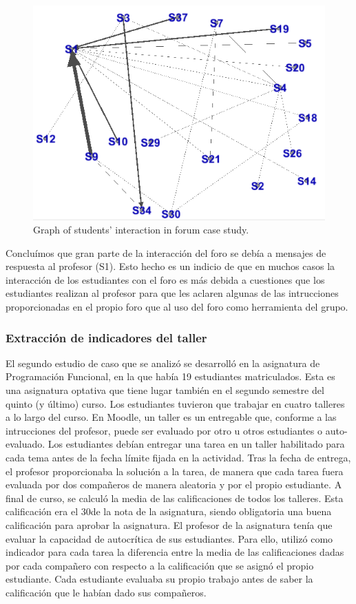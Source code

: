 \begin{figure}
	\centering
	\includegraphics[width=12cm]{EvcForo2.png}
	\caption{Graph of students' interaction in forum case study.}
	\label{fig:EvcEvaluacionInteraccionForo2}
\end{figure}

Concluímos que gran parte de la interacción del foro se debía a mensajes de respuesta al profesor (S1). Esto hecho es un indicio de que en muchos casos la interacción de los estudiantes con el foro es más debida a cuestiones que los estudiantes realizan al profesor para que les aclaren algunas de las intrucciones proporcionadas en el propio foro que al uso del foro como herramienta del grupo.

\subsubsection{Extracción de indicadores del taller}

El segundo estudio de caso que se analizó se desarrolló en la asignatura de Programación Funcional, en la que había 19 estudiantes matriculados. Esta es una asignatura optativa que tiene lugar también en el segundo semestre del quinto (y último) curso. Los estudiantes tuvieron que trabajar en cuatro talleres a lo largo del curso. En Moodle, un taller es un entregable que, conforme a las intrucciones del profesor, puede ser evaluado por otro u otros estudiantes o auto-evaluado. Los estudiantes debían entregar una tarea en un taller habilitado para cada tema antes de la fecha límite fijada en la actividad. Tras la fecha de entrega, el profesor proporcionaba la solución a la tarea, de manera que cada tarea fuera evaluada por dos compañeros de manera aleatoria y por el propio estudiante. A final de curso, se calculó la media de las calificaciones de todos los talleres. Esta calificación era el 30\percentage de la nota de la asignatura, siendo obligatoria una buena calificación para aprobar la asignatura. El profesor de la asignatura tenía que evaluar la capacidad de autocrítica de sus estudiantes. Para ello, utilizó como indicador para cada tarea la diferencia entre la media de las calificaciones dadas por cada compañero con respecto a la calificación que se asignó el propio estudiante. Cada estudiante evaluaba su propio trabajo antes de saber la calificación que le habían dado sus compañeros.

